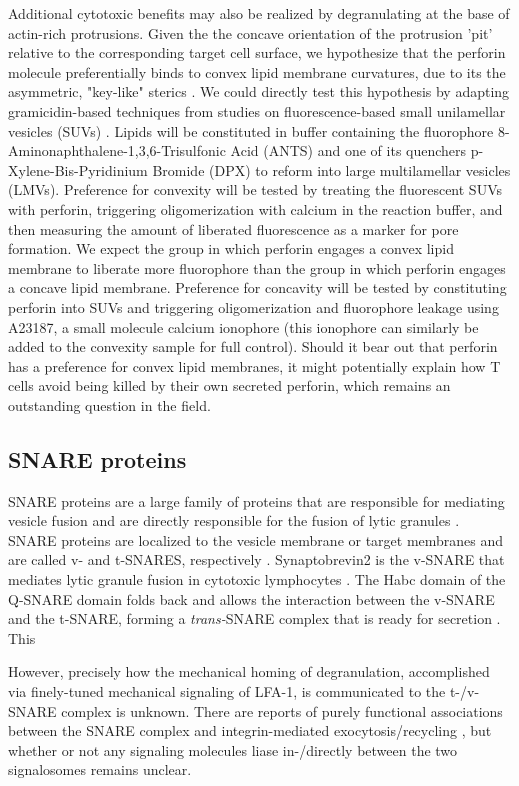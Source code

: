 Additional cytotoxic benefits may also be realized by degranulating at the base of actin-rich protrusions. Given the the concave orientation of the protrusion 'pit' relative to the corresponding target cell surface, we hypothesize that the perforin molecule preferentially binds to convex lipid membrane curvatures, due to its the  asymmetric, "key-like" sterics \cite{Law2010}. We could directly test this hypothesis by adapting gramicidin-based techniques from studies on fluorescence-based small unilamellar vesicles (SUVs) \cite{Ingolfsson2010,  Polozov2001}. Lipids will be constituted in buffer containing the fluorophore 8-Aminonaphthalene-1,3,6-Trisulfonic Acid (ANTS) and one of its quenchers p-Xylene-Bis-Pyridinium Bromide (DPX) to reform into large multilamellar vesicles (LMVs). Preference for convexity will be tested by treating the fluorescent SUVs with perforin, triggering oligomerization with calcium in the reaction buffer, and then measuring the amount of liberated fluorescence as a marker for pore formation. We expect the group in which perforin engages a convex lipid membrane to liberate more fluorophore than the group in which perforin engages a concave lipid membrane. Preference for concavity will be tested by constituting perforin into SUVs and triggering oligomerization and fluorophore leakage using A23187, a small molecule calcium ionophore (this ionophore can similarly be added to the convexity sample for full control).  Should it bear out that perforin has a preference for convex lipid membranes, it might potentially explain how T cells avoid being killed by their own secreted perforin, which remains an outstanding question in the field.

\subsection{SNARE proteins}
SNARE proteins are a large family of proteins that are responsible for mediating vesicle fusion and are directly responsible for the fusion of lytic granules \cite{Chang2017}.  SNARE proteins are localized to the vesicle membrane or target membranes and are called v- and t-SNARES, respectively \cite{Yoon2018}. Synaptobrevin2 is the v-SNARE that mediates lytic granule fusion in cytotoxic lymphocytes \cite{Chitirala2019, Matti2013}. The Habc domain of the Q-SNARE domain folds back and allows the interaction between the v-SNARE and the t-SNARE, forming a \textit{trans-}SNARE complex that is ready for secretion \cite{Yoon2018}.  This 

However, precisely how the mechanical homing of degranulation, accomplished via finely-tuned mechanical signaling of LFA-1, is communicated to the t-/v-SNARE complex is unknown.  There are reports of purely functional associations between the SNARE complex and integrin-mediated exocytosis/recycling \cite{Riggs2012, Zhuang2020}, but whether or not any signaling molecules liase in-/directly between the two signalosomes remains unclear. 

